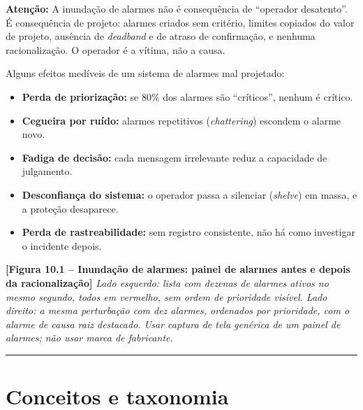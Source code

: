 \begin{caixaatencao}

\textbf{Atenção:} A inundação de alarmes não é consequência de ``operador desatento''. É consequência de projeto: alarmes criados sem critério, limites copiados do valor de projeto, ausência de \emph{deadband} e de atraso de confirmação, e nenhuma racionalização. O operador é a vítima, não a causa.

\end{caixaatencao}

Alguns efeitos medíveis de um sistema de alarmes mal projetado:

\begin{itemize}
\tightlist
\item
  \textbf{Perda de priorização:} se 80\% dos alarmes são ``críticos'', nenhum é crítico.
\item
  \textbf{Cegueira por ruído:} alarmes repetitivos (\emph{chattering}) escondem o alarme novo.
\item
  \textbf{Fadiga de decisão:} cada mensagem irrelevante reduz a capacidade de julgamento.
\item
  \textbf{Desconfiança do sistema:} o operador passa a silenciar (\emph{shelve}) em massa, e a proteção desaparece.
\item
  \textbf{Perda de rastreabilidade:} sem registro consistente, não há como investigar o incidente depois.
\end{itemize}

\begin{caixafigura}

\textbf{{[}Figura 10.1 -- Inundação de alarmes: painel de alarmes antes e depois da racionalização{]}}
\emph{Lado esquerdo: lista com dezenas de alarmes ativos no mesmo segundo, todos em vermelho, sem ordem de prioridade visível. Lado direito: a mesma perturbação com dez alarmes, ordenados por prioridade, com o alarme de causa raiz destacado. Usar captura de tela genérica de um painel de alarmes; não usar marca de fabricante.}

\end{caixafigura}

\begin{center}\rule{0.5\linewidth}{0.5pt}\end{center}

\section{Conceitos e taxonomia}\label{conceitos-e-taxonomia}

